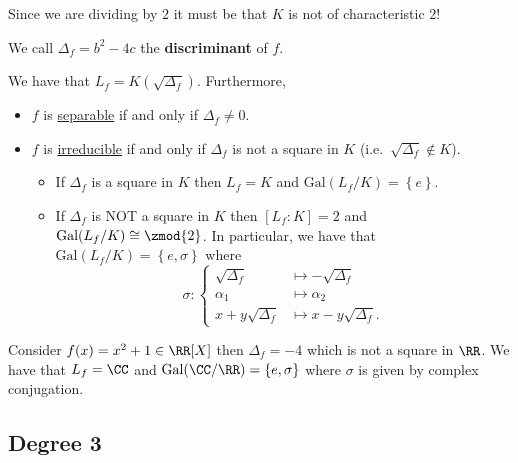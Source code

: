 \documentclass[12pt, a4paper]{article}
\newcommand{\gal}{\text{Gal}}
\begin{document}
\begin{mdremark}
    Since we are dividing by \(2\) it must be that \(K\) is not of characteristic \(2\)!
\end{mdremark}

\begin{definition}
    We call \(\Delta_f = b^2-4c\) the \textbf{discriminant} of \(f\).
\end{definition}

\begin{mdprop}
    We have that \(L_f = K\left( \sqrt{\Delta_f} \right)\). Furthermore,
    \begin{itemize}
        \item \(f\) is \ul{separable} if and only if \(\Delta_f \neq 0\).
        \item \(f\) is \ul{irreducible} if and only if \(\Delta_f\) is not a square in \(K\) (i.e.\ \(\sqrt{\Delta_f} \not\in K\)).
        \begin{itemize}
            \item If \(\Delta_f\) is a square in \(K\) then \(L_f =K\) and \(\gal(L_f/K) = \left\{ e \right\}\).
            \item If \(\Delta_f\) is NOT a square in \(K\) then \([L_f:K]=2\) and \(\gal(L_f/K) \cong \zmod{2}\). In particular, we have that \(\gal(L_f/K) = \left\{ e,\sigma \right\}\) where 
            \[\sigma: \begin{cases}
                \sqrt{\Delta_f} &\mapsto -\sqrt{\Delta_f} \\
                \alpha_1 & \mapsto \alpha_2 \\
                x+y\sqrt{\Delta_f} &\mapsto x-y\sqrt{\Delta_f}.
            \end{cases}\]
        \end{itemize}
    \end{itemize}
\end{mdprop}

\begin{example}
    Consider \(f(x)=x^2+1 \in \RR[X]\) then \(\Delta_f =-4\) which is not a square in \(\RR\). We have that \(L_f = \CC\) and \(\gal(\CC/\RR)=\left\{ e,\sigma \right\}\) where \(\sigma\) is given by complex conjugation.
\end{example}

\subsection{Degree 3}
\end{document}

